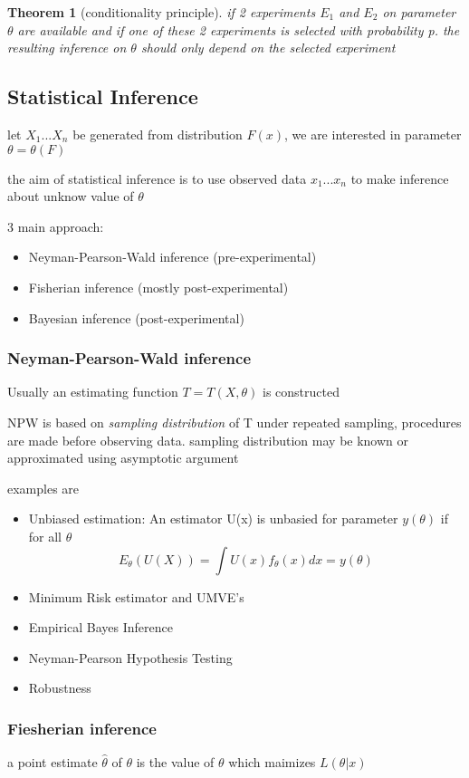 \documentclass[10pt]{article}
\theoremstyle{break}
\newtheorem{thm}{Theorem}[subsection]
\begin{document}
\begin{thm}[conditionality principle]
    if 2 experiments $E_1$ and $E_2$ on parameter $\theta$ are available
    and if one of these 2 experiments is selected with probability p.
    the resulting inference on $\theta$ should only depend on the selected experiment
\end{thm}

\subsection{Statistical Inference}
let $X_1 ... X_n$ be generated from distribution $F(x)$, we are interested in parameter $\theta=\theta(F)$


the aim of statistical inference is to use observed data $x_1 ... x_n$
to make inference about unknow value of $\theta$

3 main approach:
\begin{itemize}
    \item Neyman-Pearson-Wald inference (pre-experimental)
    \item Fisherian inference (mostly post-experimental)
    \item Bayesian inference (post-experimental)
\end{itemize}

\subsubsection{Neyman-Pearson-Wald inference}
Usually an estimating function $T=T(X,\theta)$ is constructed

NPW is based on \emph{sampling distribution} of T under repeated sampling,
procedures are made before observing data. sampling distribution may be known
or approximated using asymptotic argument

examples are
\begin{itemize}
    \item Unbiased estimation: An estimator U(x) is unbasied for parameter $y(\theta)$ if for all $\theta$
    $$E_\theta(U(X))=\int U(x)f_\theta(x)dx = y(\theta)$$
    \item Minimum Risk estimator and UMVE's
    \item Empirical Bayes Inference 
    \item Neyman-Pearson Hypothesis Testing
    \item Robustness
\end{itemize}

\subsubsection{Fiesherian inference}
a point estimate $\hat{\theta}$ of $\theta$ is the value of $\theta$ which maimizes $L(\theta|x)$
\end{document}
